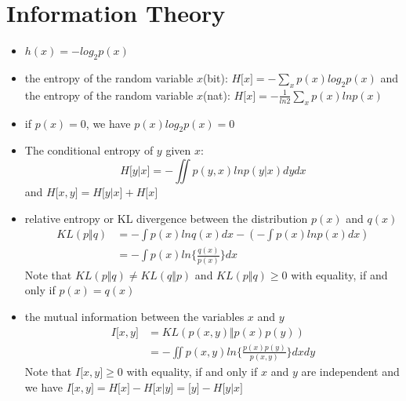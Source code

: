 \documentclass[UTF8]{article}
\begin{document}
    \section{Information Theory}
    \begin{itemize}
        \item $h(x)=-log_2p(x)$
        \item the entropy of the random variable $x$(bit): $H\lbrack x\rbrack=-\sum_xp(x)log_2p(x)$ 
        and the entropy of the random variable $x$(nat): $H\lbrack x\rbrack=-\frac{1}{ln2}\sum_xp(x)lnp(x)$
        \item if $p(x)=0$, we have $p(x)log_2p(x)=0$
        \item The conditional entropy of $y$ given $x$: 
        \[
            H\lbrack y|x\rbrack=-\iint p(y,x)lnp(y|x)dydx    
        \]
        and $H\lbrack x,y\rbrack=H\lbrack y|x\rbrack+H\lbrack x\rbrack$
        \item relative entropy or KL divergence between the distribution $p(x)$ and $q(x)$
        \begin{align}
            KL(p\Vert q)&=-\int p(x)lnq(x)dx-(-\int p(x)lnp(x)dx)\nonumber\\
            &=-\int p(x)ln\Big\{\frac{q(x)}{p(x)}\Big\}dx
        \end{align}
        Note that $KL(p\Vert q)\neq KL(q\Vert p)$ and $KL(p\Vert q)\geq 0$ with equality, if and only if 
        $p(x)=q(x)$
        \item the mutual information between the variables $x$ and $y$
        \begin{align}
            I\lbrack x,y\rbrack&=KL(p(x,y)\Vert p(x)p(y))\nonumber\\
            &=-\iint p(x,y)ln\Big\{\frac{p(x)p(y)}{p(x,y)}\Big\}dxdy
        \end{align}
        Note that $I\lbrack x,y\rbrack\geq 0$ with equality, if and only if $x$ and $y$ are independent
        and we have $I\lbrack x,y\rbrack=H\lbrack x\rbrack-H\lbrack x|y\rbrack
        =\lbrack y\rbrack-H\lbrack y|x\rbrack$
    \end{itemize}
\end{document}
